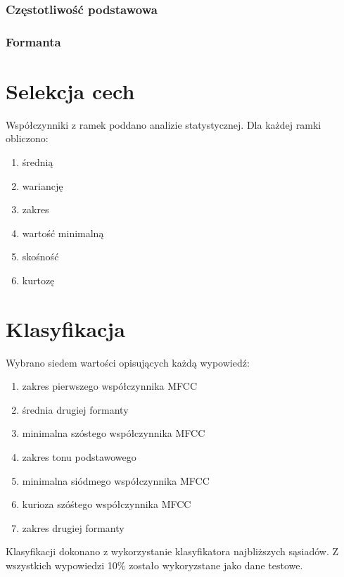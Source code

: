 \documentclass[a4paper,12pt,twoside,openany]{report}
\begin{document}
    \subsubsection{Częstotliwość podstawowa}
    \subsubsection{Formanta}
    \section{Selekcja cech}
    Współczynniki z ramek poddano analizie statystycznej.
    Dla każdej ramki obliczono:
    \begin{enumerate}
        \item średnią
        \item wariancję
        \item zakres
        \item wartość minimalną
        \item skośność
        \item kurtozę
    \end{enumerate}

    \section{Klasyfikacja}
    Wybrano siedem wartości opisujących każdą wypowiedź:
    \begin{enumerate}
        \item zakres pierwszego współczynnika MFCC
        \item średnia drugiej formanty
        \item minimalna szóstego współczynnika MFCC
        \item zakres tonu podstawowego
        \item minimalna siódmego współczynnika MFCC
        \item kurioza szóśtego współczynnika MFCC
        \item zakres drugiej formanty
    \end{enumerate}
    Klasyfikacji dokonano z wykorzystanie klasyfikatora najbliższych sąsiadów.
    Z wszystkich wypowiedzi 10\% zostało wykoryzstane jako dane testowe.
\end{document}
